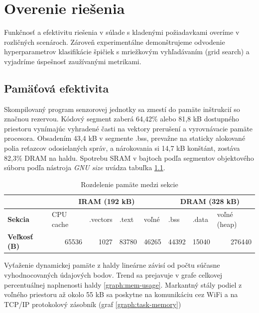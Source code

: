 \chapter{Overenie riešenia}
Funkčnosť a efektivitu riešenia v súlade s kladenými požiadavkami overíme v rozličných scenároch. Zároveň experimentálne
demonštrujeme odvodenie hyperparametrov klasifikácie špičiek s mriežkovým vyhľadávaním (grid search)
a vyjadríme úspešnosť zaužívanými metrikami.

\section{Pamäťová efektivita}
Skompilovaný program senzorovej jednotky sa zmestí do pamäte inštrukcií so značnou rezervou. Kódový segment zaberá
64,42\% alebo 81,8 kB dostupného priestoru vynímajúc vyhradené časti na vektory prerušení a vyrovnávacie pamäte procesora.
Obsadením 43,4 kB v segmente .bss, prevažne na staticky alokované polia reťazcov odosielaných správ, a nárokovania si 14,7 kB
konštánt, zostáva 82,3\% DRAM na haldu. Spotrebu SRAM v bajtoch podľa segmentov objektového súboru podľa nástroja
\emph{GNU size} uvádza tabuľka \ref{tab:ram-segments}.
\begin{table}[h]
\def\arraystretch{1.25}
\begin{tabular}{|l|llll|lll|}
\hline
                     & \multicolumn{4}{c|}{\textbf{IRAM (192 kB)}}                                                                              & \multicolumn{3}{c|}{\textbf{DRAM (328 kB)}}                                           \\ \hline
\textbf{Sekcia}      & \multicolumn{1}{l|}{CPU cache} & \multicolumn{1}{l|}{.vectors} & \multicolumn{1}{l|}{.text} & voľné                      & \multicolumn{1}{l|}{.bss}  & \multicolumn{1}{l|}{.data} & voľné (heap)                \\ \hline
\textbf{Veľkosť (B)} & \multicolumn{1}{r|}{65536}     & \multicolumn{1}{r|}{1027}     & \multicolumn{1}{r|}{83780} & \multicolumn{1}{r|}{46265} & \multicolumn{1}{r|}{44392} & \multicolumn{1}{r|}{15040} & \multicolumn{1}{r|}{276440} \\ \hline
\end{tabular}
\caption{Rozdelenie pamäte medzi sekcie}
\label{tab:ram-segments}
\end{table}

Vyťaženie dynamickej pamäte z haldy lineárne závisí od počtu súčasne vyhodnocovaných údajových bodov. Trend sa prejavuje v grafe
celkovej percentuálnej naplnenosti haldy \ref{graph:mem-usage}. Markantný stály podiel z voľného priestoru až okolo 55 kB sa poskytne na komunikáciu cez WiFi a na TCP/IP protokolový zásobník (graf \ref{graph:task-memory})

